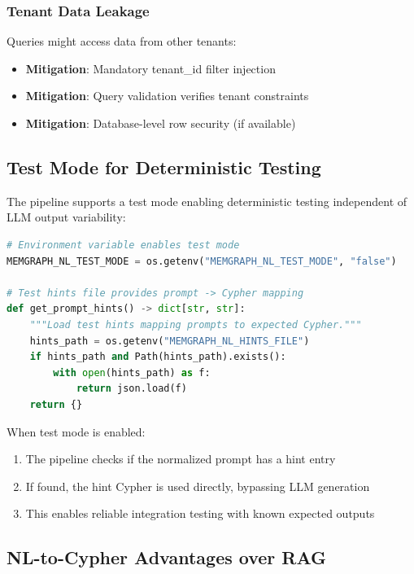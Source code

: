 \subsubsection{Tenant Data Leakage}

Queries might access data from other tenants:

\begin{itemize}
    \item \textbf{Mitigation}: Mandatory tenant\_id filter injection
    \item \textbf{Mitigation}: Query validation verifies tenant constraints
    \item \textbf{Mitigation}: Database-level row security (if available)
\end{itemize}

\subsection{Test Mode for Deterministic Testing}

The pipeline supports a test mode enabling deterministic testing independent of LLM output variability:

\begin{lstlisting}[language=Python, caption={Test mode configuration}, label=lst:test-mode]
# Environment variable enables test mode
MEMGRAPH_NL_TEST_MODE = os.getenv("MEMGRAPH_NL_TEST_MODE", "false")

# Test hints file provides prompt -> Cypher mapping
def get_prompt_hints() -> dict[str, str]:
    """Load test hints mapping prompts to expected Cypher."""
    hints_path = os.getenv("MEMGRAPH_NL_HINTS_FILE")
    if hints_path and Path(hints_path).exists():
        with open(hints_path) as f:
            return json.load(f)
    return {}
\end{lstlisting}

When test mode is enabled:
\begin{enumerate}
    \item The pipeline checks if the normalized prompt has a hint entry
    \item If found, the hint Cypher is used directly, bypassing LLM generation
    \item This enables reliable integration testing with known expected outputs
\end{enumerate}

\subsection{NL-to-Cypher Advantages over RAG}
\label{subsec:nl-cypher-advantages}

